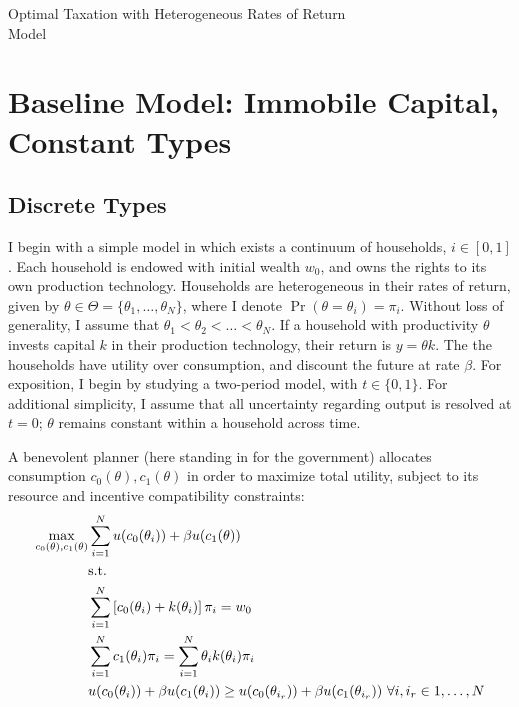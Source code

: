 \documentclass[11pt]{article}
\begin{document}
    \begin{flushleft}
        Optimal Taxation with Heterogeneous Rates of Return \\
        Model
    \end{flushleft}


\section{Baseline Model: Immobile Capital, Constant Types} \label{s1}

\subsection{Discrete Types} \label{s1d}

I begin with a simple model in which exists a continuum of households, \( i\in[0,1] \). Each household is endowed with initial wealth \( w_0 \), and owns the rights to its own production technology. Households are heterogeneous in their rates of return, given by \( \theta\in\Theta = \{\theta_1, \dots, \theta_N\} \), where I denote \( \Pr(\theta = \theta_i) = \pi_i \). Without loss of generality, I assume that \( \theta_1 < \theta_2 < \ldots < \theta_N \). If a household with productivity \( \theta \) invests capital \( k \) in their production technology, their return is \( y = \theta k \). The the households have utility over consumption, and discount the future at rate \( \beta \). For exposition, I begin by studying a two-period model, with \(t\in \{0,1\} \). For additional simplicity, I assume that all uncertainty regarding output is resolved at \( t = 0 \); \( \theta \) remains constant within a household across time.

A benevolent planner (here standing in for the government) allocates consumption \( c_0(\theta), c_1(\theta) \) in order to maximize total utility, subject to its resource and incentive compatibility constraints:
\begin{align}
    \max_{c_0(\theta), c_1(\theta)} &\sum_{i = 1}^N u(c_0(\theta_i)) + \beta u(c_1(\theta)) \label{obj_disc} \\
    &\text{s.t.} \notag \\
    &\sum_{i = 1}^N \left[ c_0(\theta_i) + k(\theta_i) \right]\pi_i = w_0 \label{rc0_disc} \\
    &\sum_{i = 1}^{N}c_1(\theta_i)\pi_i = \sum_{i = 1}^{N} \theta_i k(\theta_i)\pi_i \label{rc1_disc} \\
    &u(c_0(\theta_i)) + \beta u(c_1(\theta_i)) \geq u(c_0(\theta_{i_r})) + \beta u(c_1(\theta_{i_r}))\text{ }\forall i, i_r \in 1, \dots, N \label{icc_disc}
\end{align}
\end{document}
